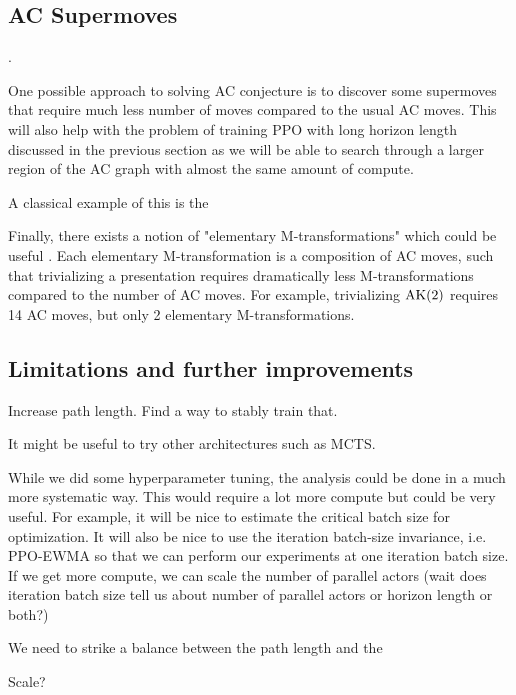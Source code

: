 \subsection{AC Supermoves}.

One possible approach to solving AC conjecture is to discover some supermoves that require much less number of moves compared to the usual AC moves. This will also help with the problem of training PPO with long horizon length discussed in the previous section as we will be able to search through a larger region of the AC graph with almost the same amount of compute. 

A classical example of this is the 

Finally, there exists a notion of "elementary M-transformations" which could be useful \cite{BurnsI, BurnsII}.
Each elementary M-transformation is a composition of AC moves, such that trivializing a presentation requires dramatically less M-transformations compared to the number of AC moves.
For example, trivializing $\text{AK}(2)$ requires 14 AC moves, but only 2 elementary M-transformations.


\subsection{Limitations and further improvements}

Increase path length. Find a way to stably train that. 

It might be useful to try other architectures such as MCTS.

While we did some hyperparameter tuning, the analysis could be done in a much more systematic way. This would require a lot more compute but could be very useful. For example, it will be nice to estimate the critical batch size for optimization. It will also be nice to use the iteration batch-size invariance, i.e. PPO-EWMA so that we can perform our experiments at one iteration batch size. If we get more compute, we can scale the number of parallel actors (wait does iteration batch size tell us about number of parallel actors or horizon length or both?)

We need to strike a balance between the path length and the 

Scale?